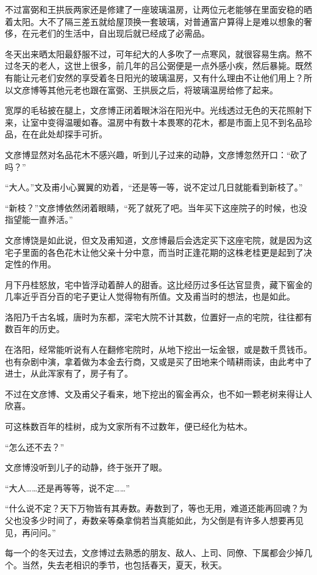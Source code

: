 不过富弼和王拱辰两家还是修建了一座玻璃温房，让两位元老能够在里面安稳的晒着太阳。大不了隔三差五就给屋顶换一套玻璃，对普通富户算得上是难以想象的奢侈，在元老们的生活中，自出现后就已经成了必需品。

冬天出来晒太阳最舒服不过，可年纪大的人多吹了一点寒风，就很容易生病。熬不过冬天的老人，这世上很多，前几年的吕公弼便是一点外感小疾，然后暴毙。既然有能让元老们安然的享受着冬日阳光的玻璃温房，又有什么理由不让他们用上？所以文彦博等其他元老也跟在富弼、王拱辰之后，将玻璃温房给修了起来。

宽厚的毛毡披在腿上，文彦博正闭着眼沐浴在阳光中。光线透过无色的天花照射下来，让室中变得温暖如春。温房中有数十本畏寒的花木，都是市面上见不到名品珍品，在在此处却探手可折。

文彦博显然对名品花木不感兴趣，听到儿子过来的动静，文彦博忽然开口：“砍了吗？”

“大人。”文及甫小心翼翼的劝着，“还是等一等，说不定过几日就能看到新枝了。”

“新枝？”文彦博依然闭着眼睛，“死了就死了吧。当年买下这座院子的时候，也没指望能一直养活。”

文彦博饶是如此说，但文及甫知道，文彦博最后会选定买下这座宅院，就是因为这宅子里面的各色花木让他父亲十分中意，而当时正逢花期的这株老桂更是起到了决定性的作用。

月下丹桂怒放，宅中皆浮动着醉人的甜香。这比经历过多任达官显贵，藏下窖金的几率近乎百分百的宅子更让人觉得物有所值。文及甫当时的想法，也是如此。

洛阳乃千古名城，唐时为东都，深宅大院不计其数，位置好一点的宅院，往往都有数百年的历史。

在洛阳，经常能听说有人在翻修宅院时，从地下挖出一坛金银，或是数千贯钱币。也有杂剧中演，拿着做为本金去行商，又或是买了田地来个晴耕雨读，由此考中了进士，从此浑家有了，房子有了。

不过在文彦博、文及甫父子看来，地下挖出的窖金再众，也不如一颗老树来得让人欣喜。

可这株数百年的桂树，成为文家所有不过数年，便已经化为枯木。

“怎么还不去？”

文彦博没听到儿子的动静，终于张开了眼。

“大人……还是再等等，说不定……”

“什么说不定？天下万物皆有其寿数。寿数到了，等也无用，难道还能再回魂？为父也没多少时间了，寿数亲等桑拿倘若当真能如此，为父倒是有许多人想要再见见，再问问。”

每一个的冬天过去，文彦博过去熟悉的朋友、敌人、上司、同僚、下属都会少掉几个。当然，失去老相识的季节，也包括春天，夏天，秋天。

